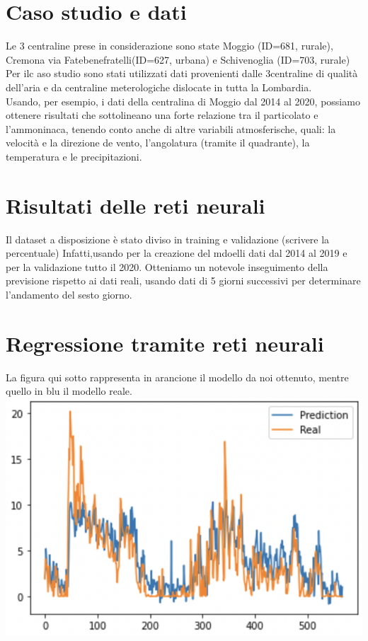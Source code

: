 \documentclass{article}
\begin{document}
\section{Caso studio e dati}

Le 3 centraline prese in considerazione sono state Moggio (ID=681, rurale), Cremona via Fatebenefratelli(ID=627, urbana)
e Schivenoglia (ID=703, rurale)
Per ilc aso studio sono stati utilizzati dati provenienti dalle 
3centraline di qualità dell'aria e da centraline meterologiche dislocate in tutta la Lombardia.
\\Usando, per esempio, i dati della centralina di Moggio dal 2014 al 2020, possiamo ottenere risultati 
che sottolineano una forte relazione tra il particolato e l'ammoninaca, tenendo conto anche di altre variabili
atmosferische, quali: la velocità e la direzione de vento, l'angolatura (tramite il quadrante), la temperatura e le precipitazioni.
\section{Risultati delle reti neurali}
Il dataset a disposizione è stato diviso in training e validazione (scrivere la percentuale)
Infatti,usando per la creazione del mdoelli dati dal 2014 al 2019 e per la 
validazione tutto il 2020. Otteniamo un notevole inseguimento della previsione  rispetto ai dati reali, 
usando dati di 5 giorni successivi per determinare l'andamento del sesto giorno.
\section{Regressione tramite reti neurali}
La figura qui sotto rappresenta in arancione il modello da noi ottenuto, 
mentre quello in blu il modello reale.
    \includegraphics[scale = 0.5]{Immagini/Regressione1.PNG}
\end{document}
